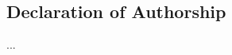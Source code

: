 \vspace*{15em}

\begin{center}
    \chapter*{Declaration of Authorship}
    
        ...

\end{center}


{}

\newpage